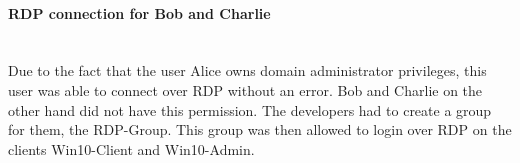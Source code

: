 \paragraph{RDP connection for Bob and Charlie}\ \\
Due to the fact that the user Alice owns domain administrator privileges, this user was able to connect over RDP without an error. Bob and Charlie on the other hand did not have this permission. The developers had to create a group for them, the RDP-Group. This group was then allowed to login over RDP on the clients Win10-Client and Win10-Admin. 